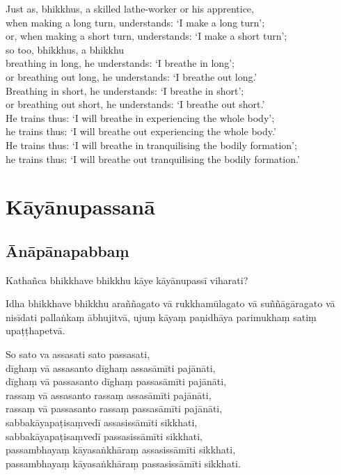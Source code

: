 Just as, bhikkhus, a skilled lathe-worker or his apprentice,\\
when making a long turn, understands: ‘I make a long turn’;\\
or, when making a short turn, understands: ‘I make a short turn’;\\
so too, bhikkhus, a bhikkhu\\
breathing in long, he understands: ‘I breathe in long’;\\
or breathing out long, he understands: ‘I breathe out long.’\\
Breathing in short, he understands: ‘I breathe in short’;\\
or breathing out short, he understands: ‘I breathe out short.’\\
He trains thus: ‘I will breathe in experiencing the whole body’;\\
he trains thus: ‘I will breathe out experiencing the whole body.’\\
He trains thus: ‘I will breathe in tranquilising the bodily formation’;\\
he trains thus: ‘I will breathe out tranquilising the bodily formation.’

\paliPage
\chapter*{Kāyānupassanā}

\section*{Ānāpānapabbaṃ}

Kathañca bhikkhave bhikkhu kāye kāyānupassī viharati?

Idha bhikkhave bhikkhu araññagato vā rukkhamūlagato vā suññāgāragato vā nisīdati
pallaṅkaṃ ābhujitvā, ujuṃ kāyaṃ paṇidhāya parimukhaṃ satiṃ upaṭṭhapetvā.

So sato va assasati sato passasati,\\
dīghaṃ vā assasanto dīghaṃ assasāmīti pajānāti,\\
dīghaṃ vā passasanto dīghaṃ passasāmīti pajānāti,\\
rassaṃ vā assasanto rassaṃ assasāmīti pajānāti,\\
rassaṃ vā passasanto rassaṃ passasāmīti pajānāti,\\
sabbakāyapaṭisaṃvedī assasissāmīti sikkhati,\\
sabbakāyapaṭisaṃvedī passasissāmīti sikkhati,\\
passambhayaṃ kāyasaṅkhāraṃ assasissāmīti sikkhati,\\
passambhayaṃ kāyasaṅkhāraṃ passasissāmīti sikkhati.

